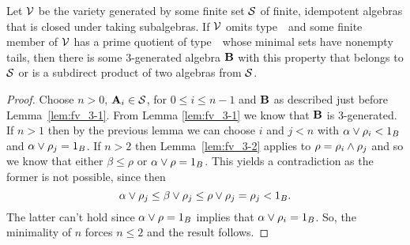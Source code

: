 

\begin{theorem}\label{thm:fv_3-4}
Let $\mathcal{V}$ be the variety generated by some finite set $\mathcal{S}$ of finite,
idempotent algebras that is closed under taking subalgebras. If\/ $\mathcal{V}$
omits type~\utyp\ and some finite member of $\mathcal{V}$ has a prime quotient
of type~\atyp\
whose minimal sets have nonempty tails, then there is some
3-generated algebra $\mathbf{B}$ with this property that belongs to $\mathcal{S}$ or is a subdirect
product of two algebras from $\mathcal{S}$.
\end{theorem}
\begin{proof}
Choose $n > 0$, $\mathbf{A}_i \in \mathcal{S}$, for $0 \le i \le n-1$ and $\mathbf{B}$
as described just before Lemma~\ref{lem:fv_3-1}. From Lemma \ref{lem:fv_3-1} we know that $\mathbf{B}$ is
3-generated. If $n > 1$ then by the previous lemma we can choose $i$
and $j < n$ with $\alpha \join \rho_i < 1_B$ and $\alpha \join \rho_j =
1_B$. If $n > 2$ then Lemma~\ref{lem:fv_3-2} applies to $\rho = \rho_i
\meet \rho_j$ and so we know that either $\beta \le \rho$ or $\alpha
\join \rho = 1_B$. This yields a contradiction as the former is not
possible, since then
\[
\alpha \join \rho_j \le \beta \join \rho_j \le \rho \join \rho_j = \rho_j < 1_B.
\]%
The latter can't hold
since  $\alpha \join \rho  = 1_B$ implies that $\alpha \join \rho_i = 1_B$.
So, the minimality of $n$ forces $n\le 2$ and the result follows.
\end{proof}


